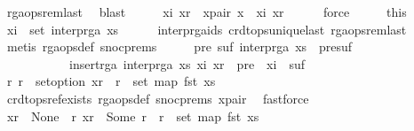 \begin{isabellebody}
\ rga{\isacharunderscore}ops{\isacharunderscore}rem{\isacharunderscore}last\ \isamarkupfalse%
\ blast\isanewline
\ \ \isamarkupfalse%
\ \isamarkupfalse%
\ xi\ xr\ \ x{\isacharunderscore}pair{\isacharcolon}\ {\isachardoublequoteopen}x\ {\isacharequal}\ {\isacharparenleft}xi{\isacharcomma}\ xr{\isacharparenright}{\isachardoublequoteclose}\isanewline
\ \ \ \ \isamarkupfalse%
\ force\isanewline
\ \ \isamarkupfalse%
\ \isamarkupfalse%
\ this\ \isamarkupfalse%
\ {\isachardoublequoteopen}xi\ {\isasymnotin}\ set\ {\isacharparenleft}interp{\isacharunderscore}rga\ xs{\isacharparenright}{\isachardoublequoteclose}\isanewline
\ \ \ \ \isamarkupfalse%
\ interp{\isacharunderscore}rga{\isacharunderscore}ids\ crdt{\isacharunderscore}ops{\isacharunderscore}unique{\isacharunderscore}last\ rga{\isacharunderscore}ops{\isacharunderscore}rem{\isacharunderscore}last\isanewline
\ \ \ \ \isamarkupfalse%
\ {\isacharparenleft}metis\ rga{\isacharunderscore}ops{\isacharunderscore}def\ snoc{\isachardot}prems{\isacharparenright}\isanewline
\ \ \isamarkupfalse%
\ \isamarkupfalse%
\ {\isachardoublequoteopen}{\isasymexists}pre\ suf{\isachardot}\ interp{\isacharunderscore}rga\ xs\ {\isacharequal}\ pre{\isacharat}suf\ {\isasymand}\isanewline
\ \ \ \ \ \ \ \ \ \ \ insert{\isacharunderscore}rga\ {\isacharparenleft}interp{\isacharunderscore}rga\ xs{\isacharparenright}\ {\isacharparenleft}xi{\isacharcomma}\ xr{\isacharparenright}\ {\isacharequal}\ pre\ {\isacharat}\ xi\ {\isacharhash}\ suf{\isachardoublequoteclose}\isanewline
\ \ \isamarkupfalse%
\ {\isacharminus}\isanewline
\ \ \ \ \isamarkupfalse%
\ {\isachardoublequoteopen}{\isasymAnd}r{\isachardot}\ r\ {\isasymin}\ set{\isacharunderscore}option\ xr\ {\isasymLongrightarrow}\ r\ {\isasymin}\ set\ {\isacharparenleft}map\ fst\ xs{\isacharparenright}{\isachardoublequoteclose}\isanewline
\ \ \ \ \ \ \isamarkupfalse%
\ crdt{\isacharunderscore}ops{\isacharunderscore}ref{\isacharunderscore}exists\ rga{\isacharunderscore}ops{\isacharunderscore}def\ snoc{\isachardot}prems\ x{\isacharunderscore}pair\ \isamarkupfalse%
\ fastforce\isanewline
\ \ \ \ \isamarkupfalse%
\ {\isachardoublequoteopen}xr\ {\isacharequal}\ None\ {\isasymor}\ {\isacharparenleft}{\isasymexists}r{\isachardot}\ xr\ {\isacharequal}\ Some\ r\ {\isasymand}\ r\ {\isasymin}\ set\ {\isacharparenleft}map\ fst\ xs{\isacharparenright}{\isacharparenright}{\isachardoublequoteclose}\isanewline

\end{isabellebody}
